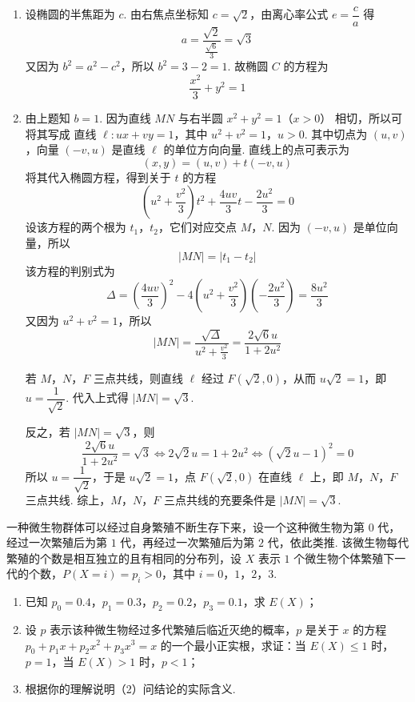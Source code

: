 \begin{solution}
\begin{enumerate}
\item 设椭圆的半焦距为 \(c\). 由右焦点坐标知 \(c=\sqrt2\)，由离心率公式 \(e=\dfrac ca\) 得
\[
a=\frac{\sqrt2}{\frac{\sqrt6}{3}}=\sqrt3
\]
又因为 \(b^2=a^2-c^2\)，所以 \(b^2=3-2=1\). 故椭圆 \(C\) 的方程为
\[
\frac{x^2}{3}+y^2=1
\]

\item 由上题知 \(b=1\). 因为直线 \(MN\) 与右半圆 \(x^2+y^2=1\)（\(x>0\)） 相切，所以可将其写成
直线 \(\ell:ux+vy=1\)，其中 \(u^2+v^2=1\)，\(u>0\).
其中切点为 \((u,v)\)，向量 \((-v,u)\) 是直线 \(\ell\) 的单位方向向量. 直线上的点可表示为
\[
(x,y)=(u,v)+t(-v,u)
\]
将其代入椭圆方程，得到关于 \(t\) 的方程
\[
\left(u^2+\frac{v^2}{3}\right)t^2+\frac{4uv}{3}t-\frac{2u^2}{3}=0
\]
设该方程的两个根为 \(t_1\)，\(t_2\)，它们对应交点 \(M\)，\(N\). 因为 \((-v,u)\) 是单位向量，所以
\[
|MN|=|t_1-t_2|
\]
该方程的判别式为
\[
\Delta=\left(\frac{4uv}{3}\right)^2-4\left(u^2+\frac{v^2}{3}\right)\left(-\frac{2u^2}{3}\right)=\frac{8u^2}{3}
\]
又因为 \(u^2+v^2=1\)，所以
\[
|MN|=\frac{\sqrt{\Delta}}{u^2+\frac{v^2}{3}}=\frac{2\sqrt6u}{1+2u^2}
\]

若 \(M\)，\(N\)，\(F\) 三点共线，则直线 \(\ell\) 经过 \(F\left(\sqrt2,0\right)\)，从而 \(u\sqrt2=1\)，即 \(u=\dfrac{1}{\sqrt2}\). 代入上式得 \(|MN|=\sqrt3\).

反之，若 \(|MN|=\sqrt3\)，则
\[
\frac{2\sqrt6u}{1+2u^2}=\sqrt3\iff 2\sqrt2u=1+2u^2\iff \left(\sqrt2u-1\right)^2=0
\]
所以 \(u=\dfrac{1}{\sqrt2}\)，于是 \(u\sqrt2=1\)，点 \(F\left(\sqrt2,0\right)\) 在直线 \(\ell\) 上，即 \(M\)，\(N\)，\(F\) 三点共线. 综上，\(M\)，\(N\)，\(F\) 三点共线的充要条件是 \(|MN|=\sqrt3\).
\end{enumerate}
\end{solution}

\begin{problem}
一种微生物群体可以经过自身繁殖不断生存下来，设一个这种微生物为第 \(0\) 代，经过一次繁殖后为第 \(1\) 代，再经过一次繁殖后为第 \(2\) 代，依此类推. 该微生物每代繁殖的个数是相互独立的且有相同的分布列，设 \(X\) 表示 \(1\) 个微生物个体繁殖下一代的个数，\(P(X=i)=p_i>0\)，其中 \(i=0\)，\(1\)，\(2\)，\(3\).

\begin{enumerate}
\item 已知 \(p_0=0.4\)，\(p_1=0.3\)，\(p_2=0.2\)，\(p_3=0.1\)，求 \(E(X)\)；
\item 设 \(p\) 表示该种微生物经过多代繁殖后临近灭绝的概率，\(p\) 是关于 \(x\) 的方程 \(p_0+p_1x+p_2x^2+p_3x^3=x\) 的一个最小正实根，求证：当 \(E(X)\le1\) 时，\(p=1\)，当 \(E(X)>1\) 时，\(p<1\)；
\item 根据你的理解说明（2）问结论的实际含义.
\end{enumerate}
\end{problem}

